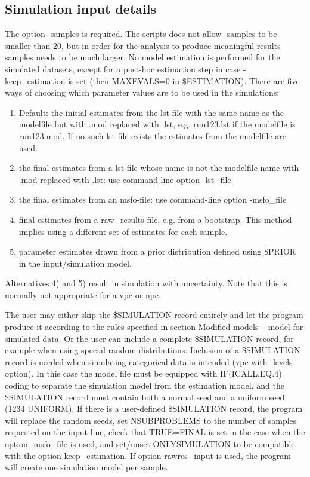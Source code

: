 \subsection{Simulation input details}
The option -samples is required. The scripts does not allow -samples to be smaller than 20, but in order for the analysis to produce meaningful results samples needs to be much larger. No model estimation is performed for the simulated datasets, except for a post-hoc estimation step in case \mbox{-keep\_estimation} is set (then MAXEVALS=0 in \$ESTIMATION). There are five ways of choosing which parameter values are to be used in the simulations: 

\begin{enumerate}
	\item Default: the initial estimates from the lst-file with the same name as the modelfile but with .mod replaced with .lst, e.g. run123.lst if the modelfile is run123.mod. If no such lst-file exists the estimates from the modelfile are used.
    \item the final estimates from a lst-file whose name is not the modelfile name with .mod replaced with .lst: use command-line option \mbox{-lst\_file}
    \item the final estimates from an msfo-file: use command-line option \mbox{-msfo\_file}
	\item final estimates from a raw\_results file, e.g. from a bootstrap. This method implies using a different set of estimates for each sample. 
	\item parameter estimates drawn from a prior distribution defined using \$PRIOR in the input/simulation model.
\end{enumerate}

Alternatives 4) and 5) result in simulation with uncertainty. Note that this is normally not appropriate for a vpc or npc. 

The user may either skip the \$SIMULATION record entirely and let the program produce it according to the rules specified in section Modified models – model for simulated data. Or the user can include a complete \$SIMULATION record, for example when using special random distributions. Inclusion of a \$SIMULATION record is needed when simulating categorical data is intended (vpc with -levels option). In this case the model file must be equipped with IF(ICALL.EQ.4) coding to separate the simulation model from the estimation model, and the \$SIMULATION record must contain both a normal seed and a uniform seed (1234 UNIFORM). If there is a user-defined \$SIMULATION record, the program will replace the random seeds, set NSUBPROBLEMS to the number of samples requested on the input line, check that TRUE=FINAL is set in the case when the option -msfo\_file is used, and set/unset ONLYSIMULATION to be compatible with the option keep\_estimation. If option rawres\_input is used, the program will create one simulation model per sample.


